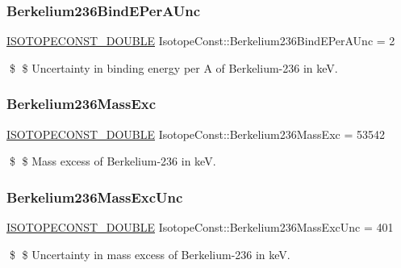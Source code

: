 \subsubsection{\texorpdfstring{Berkelium236\+Bind\+E\+Per\+A\+Unc}{Berkelium236BindEPerAUnc}}
{\footnotesize\ttfamily \mbox{\hyperlink{group___isotope_const-_macros_ga8f45a7272ce02c0b4c65c44636ed719a}{I\+S\+O\+T\+O\+P\+E\+C\+O\+N\+S\+T\+\_\+\+D\+O\+U\+B\+LE}} Isotope\+Const\+::\+Berkelium236\+Bind\+E\+Per\+A\+Unc = 2}

\$ \$ Uncertainty in binding energy per A of Berkelium-\/236 in keV. \mbox{\label{group___isotope_const-_berkelium-_bk236_gacf44ecb61d64ab5c987e67db6e7699f0}} 
\subsubsection{\texorpdfstring{Berkelium236\+Mass\+Exc}{Berkelium236MassExc}}
{\footnotesize\ttfamily \mbox{\hyperlink{group___isotope_const-_macros_ga8f45a7272ce02c0b4c65c44636ed719a}{I\+S\+O\+T\+O\+P\+E\+C\+O\+N\+S\+T\+\_\+\+D\+O\+U\+B\+LE}} Isotope\+Const\+::\+Berkelium236\+Mass\+Exc = 53542}

\$ \$ Mass excess of Berkelium-\/236 in keV. \mbox{\label{group___isotope_const-_berkelium-_bk236_ga856220722353d8f6c84b9b0599f1d181}} 
\subsubsection{\texorpdfstring{Berkelium236\+Mass\+Exc\+Unc}{Berkelium236MassExcUnc}}
{\footnotesize\ttfamily \mbox{\hyperlink{group___isotope_const-_macros_ga8f45a7272ce02c0b4c65c44636ed719a}{I\+S\+O\+T\+O\+P\+E\+C\+O\+N\+S\+T\+\_\+\+D\+O\+U\+B\+LE}} Isotope\+Const\+::\+Berkelium236\+Mass\+Exc\+Unc = 401}

\$ \$ Uncertainty in mass excess of Berkelium-\/236 in keV. \mbox{\label{group___isotope_const-_berkelium-_bk236_ga7b1613ce9894d836b18531b5dd00dbbb}} 
